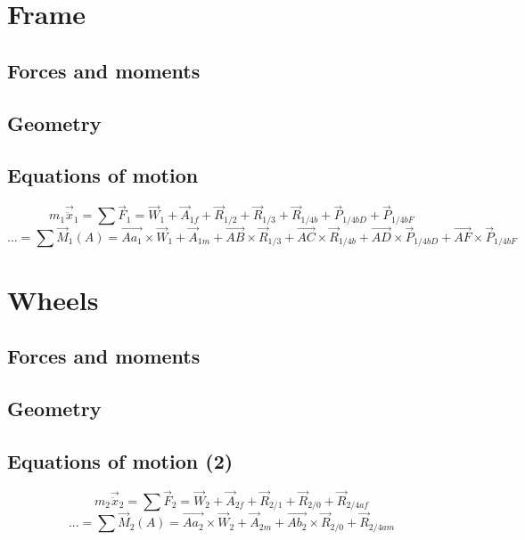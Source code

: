 \documentclass[10pt]{extarticle}
\begin{document}
\section{Frame}
\subsection{Forces and moments}
\subsection{Geometry}
\subsection{Equations of motion}
\begin{equation}
    m_1\vec{\ddot{x}}_1 = \sum \vec{F}_1 = \vec{W}_1 + \vec{A}_{1f} + \vec{R}_{1/2} + \vec{R}_{1/3} + \vec{R}_{1/4b} + \vec{P}_{1/4bD} + \vec{P}_{1/4bF}
\end{equation}
\begin{equation}
    ... = \sum \vec{M}_1(A) = \vec{Aa_1}\times \vec{W}_1 + \vec{A}_{1m} + \vec{AB}\times \vec{R}_{1/3} + \vec{AC}\times \vec{R}_{1/4b} + \vec{AD}\times \vec{P}_{1/4bD} + \vec{AF}\times \vec{P}_{1/4bF}
\end{equation}

\section{Wheels}
\subsection{Forces and moments}
\subsection{Geometry}
\subsection{Equations of motion (2)}
\begin{equation}
    m_2\vec{\ddot{x}}_2 = \sum \vec{F}_2 = \vec{W}_2 + \vec{A}_{2f} + \vec{R}_{2/1}+ \vec{R}_{2/0} + \vec{R}_{2/4af}
\end{equation}
\begin{equation}
    ... = \sum \vec{M}_2(A) =  \vec{Aa_2}\times \vec{W}_2 + \vec{A}_{2m} + \vec{Ab_2}\times \vec{R}_{2/0} + \vec{R}_{2/4am}
\end{equation}
\end{document}
